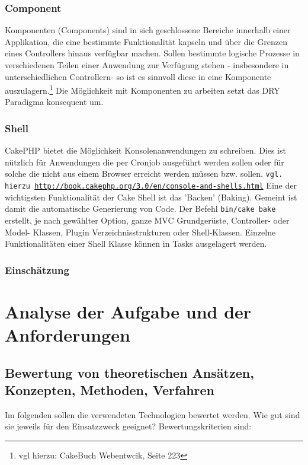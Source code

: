 	\subsubsection{Component}
	Komponenten (Components) sind in sich geschlossene Bereiche innerhalb einer Applikation, die eine bestimmte Funktionalität kapseln und über die Grenzen eines Controllers hinaus verfügbar machen. Sollen bestimmte logische Prozesse in verschiedenen Teilen einer Anwendung zur Verfügung stehen - insbesondere in unterschiedlichen Controllern- so ist es sinnvoll diese in eine Komponente auszulagern.\footnote{vgl hierzu: CakeBuch Webentwcik, Seite 223}
	Die Möglichkeit mit Komponenten zu arbeiten setzt das DRY Paradigma konsequent um.
	
	\subsubsection{Shell}	
	CakePHP bietet die Möglichkeit Konsolenanwendungen zu schreiben. Dies ist nützlich für Anwendungen die per Cronjob ausgeführt werden sollen oder für solche die nicht aus einem Browser erreicht werden müssen bzw. sollen. \texttt{vgl. hierzu \url{http://book.cakephp.org/3.0/en/console-and-shells.html}}
	Eine der wichtigsten Funktionalität der Cake Shell ist das 'Backen' (Baking). Gemeint ist damit die automatische Generierung von Code. Der Befehl \texttt{bin/cake bake} erstellt, je nach gewählter Option, ganze MVC Grundgerüste, Controller- oder Model- Klassen, Plugin Verzeichnisstrukturen oder Shell-Klassen. Einzelne Funktionalitäten einer Shell Klasse können in Tasks ausgelagert werden.  
	
	\subsubsection{Einschätzung}
	
	
	
	\section{Analyse der Aufgabe und der Anforderungen}
	
	\subsection{Bewertung von theoretischen Ansätzen, Konzepten, Methoden, Verfahren}
		Im folgenden sollen die verwendeten Technologien bewertet werden. 
		Wie gut sind sie jeweils für den Einsatzzweck geeignet?
		Bewertungskriterien sind: 
		
